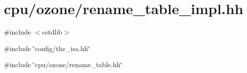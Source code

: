 \hypertarget{rename__table__impl_8hh}{
\section{cpu/ozone/rename\_\-table\_\-impl.hh}
\label{rename__table__impl_8hh}
}
{\ttfamily \#include $<$cstdlib$>$}\par
{\ttfamily \#include \char`\"{}config/the\_\-isa.hh\char`\"{}}\par
{\ttfamily \#include \char`\"{}cpu/ozone/rename\_\-table.hh\char`\"{}}\par
